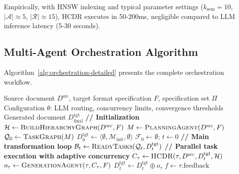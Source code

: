\documentclass{ieeeaccess}
\begin{document}
Empirically, with HNSW indexing and typical parameter settings (\(k_{\text{sem}} = 10\), \(|\mathcal{A}| \approx 5\), \(|\mathcal{R}| \approx 15\)), HCDR executes in 50-200ms, negligible compared to LLM inference latency (5-30 seconds).

\subsection{Multi-Agent Orchestration Algorithm}

Algorithm~\ref{alg:orchestration-detailed} presents the complete orchestration workflow.

\begin{algorithm}[!t]
\caption{Multi-Agent Document Transformation Orchestration}
\label{alg:orchestration-detailed}
\footnotesize
\begin{algorithmic}[1]
\Require Source document \(D^{\text{src}}\), target format specification \(F\), specification set \(\Pi\)
\Require Configuration \(\theta\): LLM routing, concurrency limits, convergence thresholds
\Ensure Generated document \(D^{\text{tgt}}_{\text{final}}\)
\State \textbf{// Initialization}
\State \(\mathcal{H} \gets \textsc{BuildHierarchyGraph}(D^{\text{src}}, F)\) 
\State \(M \gets \textsc{PlanningAgent}(D^{\text{src}}, F)\) 
\State \(\mathcal{Q}_0 \gets \textsc{TaskGraph}(M)\) 
\State \(D^{\text{tgt}}_0 \gets \langle \emptyset, \mathcal{M}_{\text{init}}, \emptyset \rangle\) 
\State \(\mathcal{F}_0 \gets \emptyset\); \quad \(t \gets 0\)
\State
\State \textbf{// Main transformation loop}
    \State \(\mathcal{B}_t \gets \textsc{ReadyTasks}(\mathcal{Q}_t, D^{\text{tgt}}_t)\) 
    \State
    \State \textbf{// Parallel task execution with adaptive concurrency}
            \State \(C_\tau \gets \textsc{HCDR}(\tau, D^{\text{src}}, D^{\text{tgt}}_t, \mathcal{H})\) 
            \State \(o_\tau \gets \textsc{GenerationAgent}(\tau, C_\tau, F)\) 
            \State \(D^{\text{tgt}}_t \gets D^{\text{tgt}}_t \oplus o_\tau\) 
            \State \(f \gets \tau.\text{feedback}\) 

\end{algorithmic}
\end{algorithm}
\end{document}
